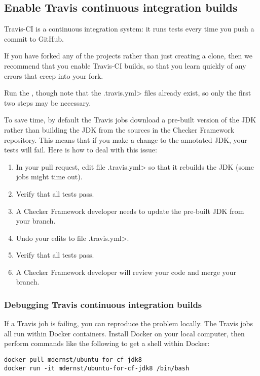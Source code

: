 \subsection{Enable Travis continuous integration builds\label{building-travis}}

Travis-CI is a continuous integration system:  it runs tests every time you
push a commit to GitHub.

If you have forked any of the projects rather than just creating a clone,
then we recommend that you enable Travis-CI builds,
so that you learn quickly of any errors that creep into your fork.

Run the
,
though note that the \<.travis.yml> files already exist, so only the first
two steps may be necessary.

To save time, by default the Travis jobs download a pre-built version of
the JDK rather than building the JDK from the sources in the Checker
Framework repository.  This means that if you make a change to the
annotated JDK, your tests will fail.  Here is how to deal with this issue:
\begin{enumerate}
\item
In your pull request, edit file \<.travis.yml> so that it rebuilds
the JDK (some jobs might time out).
\item Verify that all tests pass.
\item A Checker Framework developer needs to update the pre-built JDK from
  your branch.
\item
  Undo your edits to file \<.travis.yml>.
\item Verify that all tests pass.
\item A Checker Framework developer will review your code and merge your branch.
\end{enumerate}


\subsubsection{Debugging Travis continuous integration builds\label{building-travis-debug}}

If a Travis job is failing, you can reproduce the problem locally.
The Travis jobs all run within Docker containers.
Install Docker on your local computer, then perform commands like the
following to get a shell within Docker:

\begin{Verbatim}
docker pull mdernst/ubuntu-for-cf-jdk8
docker run -it mdernst/ubuntu-for-cf-jdk8 /bin/bash
\end{Verbatim}

